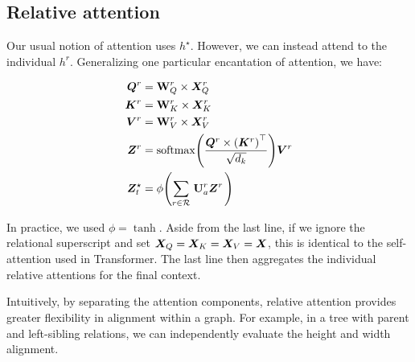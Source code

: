 \subsection{Relative attention}

\newcommand{\Align}[1]{\mathrm{align}{\parens{#1}}}
\newcommand{\score}[1]{\mathrm{score}{\parens{#1}}}

Our usual notion of attention uses $h^\star$. However, we can instead attend to 
the individual $h^r$. Generalizing one particular encantation of attention, we 
have:

\begin{align*}
	\mQ^r &= \rmW_Q^r \times \mX_Q^r \\
	\mK^r &= \rmW_K^r \times \mX_K^r \\
	\mV^r &= \rmW_V^r \times \mX_V^r \\
	\mZ^r &= \softmax{\parens{\frac{\mQ^r \times 
\parens{\mK^r}^\top}{\sqrt{d_k}}}}\mV^r \\
	\mZ^\star_t &= \phi{\parens{%
		\sum_{\er \in \relations}\left.
			\rmU_a^r \mZ^r
	\right.}}
\end{align*}

In practice, we used $\phi=\tanh$.  Aside from the last line, if we ignore the 
relational superscript and set ${\bm{X}}_Q={\bm{X}}_K={\bm{X}}_V={\bm{X}}$, this is identical to the 
self-attention used in Transformer. The last line then aggregates the individual 
relative attentions for the final context.

Intuitively, by separating the attention components, relative attention provides 
greater flexibility in alignment within a graph. For example, in a tree with 
parent and left-sibling relations, we can independently evaluate the height and 
width alignment.


